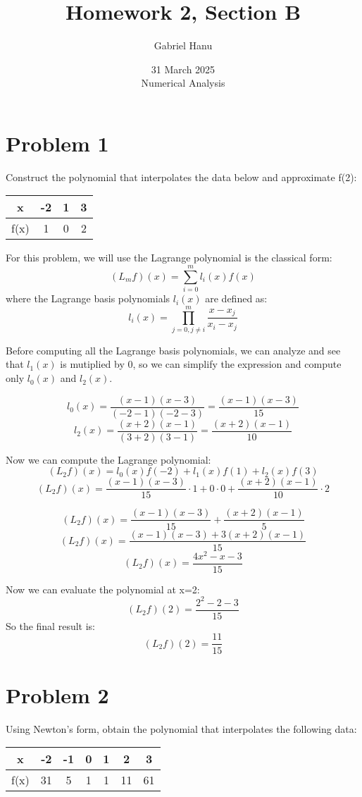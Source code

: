 \documentclass{article}
\title{Homework 2, Section B}
\author{Gabriel Hanu}
\date{31 March 2025 \\
Numerical Analysis}
\begin{document}
\maketitle

\section*{Problem 1}
Construct the polynomial that interpolates the data below and approximate f(2):
\begin{center}
    \begin{tabular}{c| c c c}
        x & -2 & 1 & 3 \\
        \hline
        f(x) & 1 & 0 & 2 \\
    \end{tabular}
\end{center}

For this problem, we will use the Lagrange polynomial is the classical form:
\[
    (L_mf)(x) = \sum_{i=0}^{m} l_i(x)f(x)
\]
where the Lagrange basis polynomials \(l_i(x)\) are defined as:
\[
    l_i(x) = \prod_{j=0, j\neq i}^{m} \frac{x-x_j}{x_i-x_j}
\]

Before computing all the Lagrange basis polynomials, we can analyze and see
that \(l_1(x)\) is mutiplied by 0, so we can simplify the expression and
compute only \(l_0(x)\) and \(l_2(x)\).

\[
    l_0(x) = \frac{(x-1)(x-3)}{(-2-1)(-2-3)} = \frac{(x-1)(x-3)}{15}
\]
\[
    l_2(x) = \frac{(x+2)(x-1)}{(3+2)(3-1)} = \frac{(x+2)(x-1)}{10}
\]

Now we can compute the Lagrange polynomial:
\[
    (L_2f)(x) = l_0(x)f(-2) + l_1(x)f(1) + l_2(x)f(3)
\]
\[
    (L_2f)(x) = \frac{(x-1)(x-3)}{15} \cdot 1 + 0 \cdot 0 + \frac{(x+2)(x-1)}{10} \cdot 2
\]

\[
    (L_2f)(x) = \frac{(x-1)(x-3)}{15} + \frac{(x+2)(x-1)}{5}
\]
\[
    (L_2f)(x) = \frac{(x-1)(x-3) + 3(x+2)(x-1)}{15}
\]
\[
    (L_2f)(x) = \frac{4x^2-x-3}{15}
\]

Now we can evaluate the polynomial at x=2:
\[
    (L_2f)(2) = \frac{2^2 - 2 - 3}{15}
\]
So the final result is:
\[
    (L_2f)(2) = \frac{11}{15}
\]

\section*{Problem 2}
Using Newton’s form, obtain the polynomial that interpolates the following data:
\begin{center}
    \begin{tabular}{c| c c c c c c}
        x & -2 & -1 & 0 & 1 & 2 & 3 \\
        \hline
        f(x) & 31 & 5 & 1 & 1 & 11 & 61 \\
    \end{tabular}
\end{center}
\end{document}
